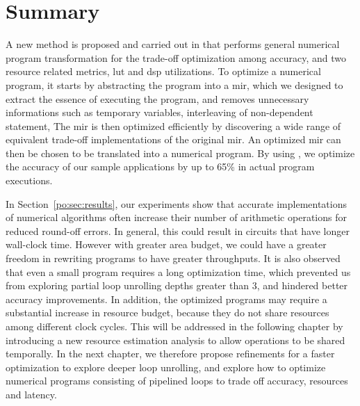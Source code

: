 \section{Summary}
\label{po:sec:conclusion}

A new method is proposed and carried out in \soap{} that performs general
numerical program transformation for the trade-off optimization among accuracy,
and two resource related metrics, \gls{lut} and \gls{dsp} utilizations.  To
optimize a numerical program, it starts by abstracting the program into a
\gls{mir}, which we designed to extract the essence of executing the program,
and removes unnecessary informations such as temporary variables, interleaving
of non-dependent statement, \etc{} The \gls{mir} is then optimized efficiently
by discovering a wide range of equivalent trade-off implementations of the
original \gls{mir}\@.  An optimized \gls{mir} can then be chosen to be
translated into a numerical program.  By using \soap, we optimize the accuracy
of our sample applications by up to 65\% in actual program executions.

In Section~\ref{po:sec:results}, our experiments show that accurate
implementations of numerical algorithms often increase their number of
arithmetic operations for reduced round-off errors.  In general, this could
result in circuits that have longer wall-clock time.  However with greater
area budget, we could have a greater freedom in rewriting programs to have
greater throughputs.  It is also observed that even a small program requires
a long optimization time, which prevented us from exploring partial loop
unrolling depths greater than $3$, and hindered better accuracy improvements.
In addition, the optimized programs may require a substantial increase in
resource budget, because they do not share resources among different clock
cycles.  This will be addressed in the following chapter by introducing a new
resource estimation analysis to allow operations to be shared temporally.  In
the next chapter, we therefore propose refinements for a faster optimization to
explore deeper loop unrolling, and explore how to optimize numerical programs
consisting of pipelined loops to trade off accuracy, resources and latency.
